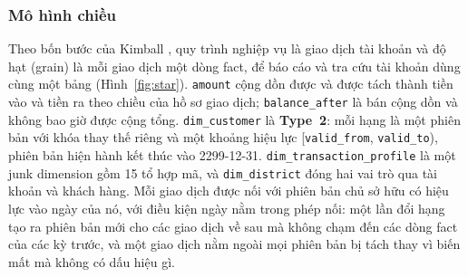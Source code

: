 \documentclass[peerreview]{IEEEtran}
\newcommand{\tbl}[1]{\texttt{#1}}
\begin{document}
\subsubsection{Mô hình chiều}
Theo bốn bước của Kimball \cite{kimball2013}, quy trình nghiệp vụ là giao dịch tài khoản và
độ hạt (grain) là mỗi giao dịch một dòng fact, để báo cáo và tra cứu tài khoản dùng cùng một
bảng (Hình~\ref{fig:star}). \tbl{amount} cộng dồn được và được tách thành tiền vào và tiền ra
theo chiều của hồ sơ giao dịch; \tbl{balance\_after} là bán cộng dồn và không bao giờ được
cộng tổng. \tbl{dim\_customer} là \textbf{Type~2}: mỗi hạng là một phiên bản với khóa thay
thế riêng và một khoảng hiệu lực [\tbl{valid\_from}, \tbl{valid\_to}), phiên bản hiện hành
kết thúc vào 2299-12-31. \tbl{dim\_transaction\_profile} là một junk dimension gồm 15 tổ hợp
mã, và \tbl{dim\_district} đóng hai vai trò qua tài khoản và khách hàng. Mỗi giao dịch được
nối với phiên bản chủ sở hữu có hiệu lực vào ngày của nó, với điều kiện ngày nằm trong phép
nối: một lần đổi hạng tạo ra phiên bản mới cho các giao dịch về sau mà không chạm đến các
dòng fact của các kỳ trước, và một giao dịch nằm ngoài mọi phiên bản bị tách thay vì biến mất
mà không có dấu hiệu gì.
\end{document}

